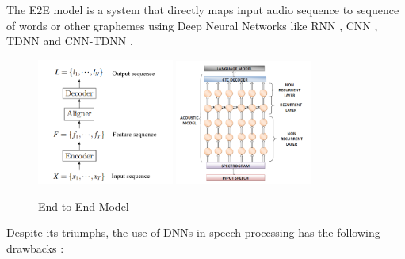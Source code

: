 The E2E model \cite{eeckt_continual_2021} is a system that directly maps input audio sequence to sequence of words or other graphemes \cite{amodei_deep_2015-1, bell_adaptation_2020} using Deep Neural Networks like RNN \cite{sak_long_2014}, CNN \cite{abdel-hamid_exploring_2013}, TDNN \cite{kreyssig_improved_2018} and CNN-TDNN \cite{ghahremani_acoustic_2016}.

\begin{figure}[h]
    \centering
    \includegraphics[width=0.4\textwidth]{img/E2E.png}
    \includegraphics[width=0.4\textwidth]{img/e2est.png}
    \caption{End to End Model}
    \label{fig:e2e-model}
\end{figure}

Despite its triumphs, the use of DNNs in speech processing has the following drawbacks \cite{backstrom_introduction_2022}:

